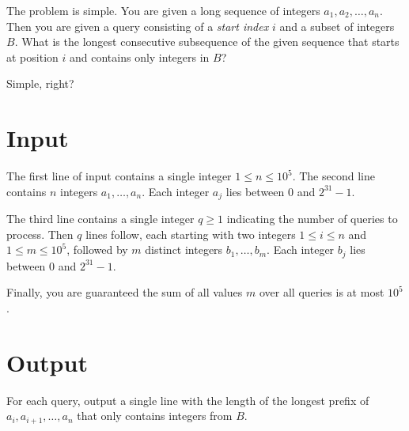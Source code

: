 
The problem is simple. You are given a long sequence of integers
$a_1, a_2, \ldots, a_n$. Then you are given a query consisting of a {\em start index}
$i$ and a subset of integers $B$. What is the longest consecutive subsequence of the given sequence
that starts at position $i$ and contains only integers in $B$?

Simple, right?

\section*{Input}
The first line of input contains a single integer $1 \leq n \leq 10^5$.
The second line contains $n$ integers $a_1, \ldots, a_n$.
Each integer $a_j$ lies between 0 and $2^{31}-1$.

The third line contains a single integer $q \geq 1$ indicating
the number of queries to process. Then $q$ lines follow, each starting with
two integers $1 \leq i \leq n$ and $1 \leq m \leq 10^5$, followed by $m$ distinct integers $b_1, \ldots, b_m$.
Each integer $b_j$ lies between 0 and $2^{31}-1$.

Finally, you are guaranteed the sum of all values $m$ over all queries is at most
$10^5$.

\section*{Output}
For each query, output a single line with the length of the longest prefix
of $a_i, a_{i+1}, \ldots, a_n$ that only contains integers from $B$.
